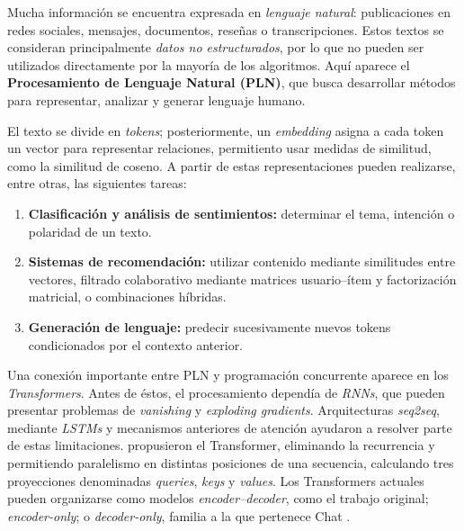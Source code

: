 \documentclass[11pt,a4paper]{article}
\begin{document}
\vspace*{.4cm}
\noindent
Mucha información se encuentra expresada en
\textit{lenguaje natural}: publicaciones en redes sociales, mensajes, documentos,
reseñas o transcripciones. Estos textos se consideran
principalmente \textit{datos no estructurados}, por lo que no pueden ser utilizados
directamente por la mayoría de los algoritmos. Aquí aparece el
\textbf{Procesamiento de Lenguaje Natural (PLN)}, que busca desarrollar
métodos para representar, analizar y generar lenguaje humano.

El texto se divide en \textit{tokens}; posteriormente,
un \textit{embedding} asigna a cada token un vector para representar relaciones, permitiento usar medidas de similitud, como la similitud de coseno.
A partir de estas representaciones pueden realizarse,
entre otras, las siguientes tareas:
\begin{enumerate}[label=\arabic*., leftmargin=*]
    \item \textbf{Clasificación y análisis de sentimientos:} determinar el tema,
    intención o polaridad de un texto.
    \item \textbf{Sistemas de recomendación:} utilizar contenido mediante
    similitudes entre vectores, filtrado colaborativo mediante matrices
    usuario--ítem y factorización matricial, o combinaciones híbridas.
    \item \textbf{Generación de lenguaje:} predecir sucesivamente nuevos tokens
    condicionados por el contexto anterior.
\end{enumerate}

Una conexión importante entre PLN y programación concurrente
aparece en los \textit{Transformers}. Antes de éstos, el procesamiento dependía
de \textit{RNNs}, que pueden presentar problemas de
\textit{vanishing} y \textit{exploding gradients}. Arquitecturas \textit{seq2seq}, mediante \textit{LSTMs}
y mecanismos anteriores de atención ayudaron a resolver parte de estas
limitaciones. \textcite{vaswani2017attention} propusieron el
Transformer, eliminando la recurrencia y permitiendo paralelismo en
distintas posiciones de una secuencia, calculando tres proyecciones
denominadas \textit{queries}, \textit{keys} y \textit{values}. Los Transformers actuales pueden
organizarse como modelos \textit{encoder--decoder}, como el trabajo original;
\textit{encoder-only}; o \textit{decoder-only}, familia a la que pertenece Chat 
\parencite{statquestNN,sandersonNN}.
\end{document}
